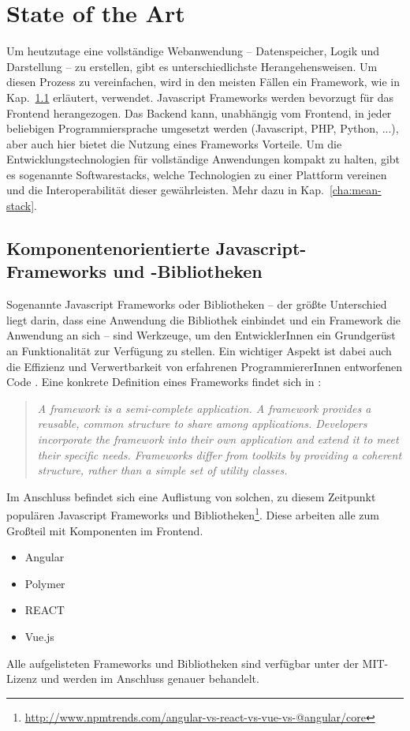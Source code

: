 \chapter{State of the Art}
\label{cha:StateOfTheArt}
Um heutzutage eine vollständige Webanwendung -- Datenspeicher, Logik und Darstellung -- zu erstellen, gibt es unterschiedlichste Herangehensweisen. Um diesen Prozess zu vereinfachen, wird in den meisten Fällen ein Framework, wie in Kap.~\ref{cha:javascript-frameworks} erläutert, verwendet. Javascript Frameworks werden bevorzugt für das Frontend herangezogen. Das Backend kann, unabhängig vom Frontend, in jeder beliebigen Programmiersprache umgesetzt werden (Javascript, PHP, Python, ...), aber auch hier bietet die Nutzung eines Frameworks Vorteile. Um die Entwicklungstechnologien für vollständige Anwendungen kompakt zu halten, gibt es sogenannte Softwarestacks, welche Technologien zu einer Plattform vereinen und die Interoperabilität dieser gewährleisten. Mehr dazu in Kap.~\ref{cha:mean-stack}.

\section{Komponentenorientierte Javascript-Frameworks und -Bibliotheken}
\label{cha:javascript-frameworks}
Sogenannte Javascript Frameworks oder Bibliotheken -- der größte Unterschied liegt darin, dass eine Anwendung die Bibliothek einbindet und ein Framework die Anwendung an sich -- sind Werkzeuge, um den EntwicklerInnen ein Grundgerüst an Funktionalität zur Verfügung zu stellen. Ein wichtiger Aspekt ist dabei auch die Effizienz und Verwertbarkeit von erfahrenen ProgrammiererInnen entworfenen Code \cite{js-frameworks}.
Eine konkrete Definition eines Frameworks findet sich in \cite{def-framework}: 
\begin{quote}\textit{A framework is a semi-complete application. A framework provides a reusable, common structure to share among applications. Developers incorporate the framework into their own application and extend it to meet their specific needs. Frameworks differ from toolkits by providing a coherent structure, rather than a simple set of utility classes.}
\end{quote}

Im Anschluss befindet sich eine Auflistung von solchen, zu diesem Zeitpunkt populären Javascript Frameworks und Bibliotheken\footnote{\url{http://www.npmtrends.com/angular-vs-react-vs-vue-vs-@angular/core}}. Diese arbeiten alle zum Großteil mit Komponenten im Frontend.
\begin{itemize}  
	\item Angular
	\item Polymer
	\item REACT
	\item Vue.js
\end{itemize}
Alle aufgelisteten Frameworks und Bibliotheken sind verfügbar unter der MIT-Lizenz und werden im Anschluss genauer behandelt.


